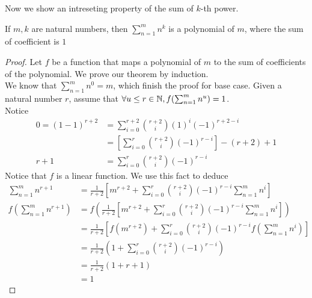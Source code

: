 \documentclass{report}
\begin{document}
Now we show an intreseting property of the sum of $k$-th power.
\begin{theorem}
If $m,k$ are natural numbers, then $\sum_{n=1}^{m} n^k$ is a polynomial of $m$, where the sum of coefficient is $1$
\end{theorem}
\begin{proof}
Let $f$ be a function that maps a polynomial of $m$ to the sum of coefficients of the polynomial.
We prove our theorem by induction.\\

We know that $\sum_{n=1}^{m}n^0=m$, which finish the proof for base case. Given a natural number $r$, assume that $\forall u\leq r\in \mathbb{N}, f(\sum_{n=1}^{m}n^u)=1$.\\

Notice
\begin{align}
  0=(1-1)^{r+2} &= \sum_{i=0}^{r+2}\binom{r+2}{i}(1)^i(-1)^{r+2-i}\\
                &= [\sum_{i=0}^{r}\binom{r+2}{i}(-1)^{r-i}]-(r+2)+1\\
  r+1 &= \sum_{i=0}^{r}\binom{r+2}{i}(-1)^{r-i} 
\end{align} 
Notice that $f$ is a linear function. We use this fact to deduce
\begin{align}
  \sum_{n=1}^{m}n^{r+1} &= \frac{1}{r+2}[m^{r+2}+\sum_{i=0}^{r}\binom{r+2}{i}(-1)^{r-i}\sum_{n=1}^{m}n^i]\\
  f(\sum_{n=1}^{m}n^{r+1}) &=f(\frac{1}{r+2}[m^{r+2}+\sum_{i=0}^{r}\binom{r+2}{i}(-1)^{r-i}\sum_{n=1}^{m}n^i])\\
                           &= \frac{1}{r+2}[f(m^{r+2})+\sum_{i=0}^{r}\binom{r+2}{i}(-1)^{r-i}f(\sum_{n=1}^{m}n^i)]\\
                           &= \frac{1}{r+2}(1+\sum_{i=0}^{r}\binom{r+2}{i}(-1)^{r-i})\\
                           &= \frac{1}{r+2}(1+r+1)\\
                           &= 1
\end{align} 
\end{proof}
\end{document}

